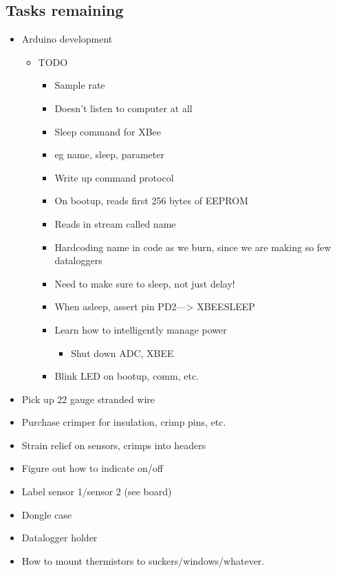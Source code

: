 \documentclass{article}
\begin{document}
\subsection{Tasks remaining}

\begin{itemize}
\item Arduino development

\begin{itemize}
\item TODO

\begin{itemize}
\item Sample rate
\item Doesn't listen to computer at all
\item Sleep command for XBee
\item eg name, sleep, parameter
\item Write up command protocol
\item On bootup, reads first 256 bytes of EEPROM
\item Reads in stream called name
\item Hardcoding name in code as we burn, since we are making so few dataloggers
\item Need to make sure to sleep, not just delay!
\item When asleep, assert pin PD2---\textgreater{} XBEESLEEP
\item Learn how to intelligently manage power

\begin{itemize}
\item Shut down ADC, XBEE
\end{itemize}
\item Blink LED on bootup, comm, etc.
\end{itemize}
\end{itemize}
\item Pick up 22 gauge stranded wire
\item Purchase crimper for insulation, crimp pins, etc.
\item Strain relief on sensors, crimps into headers
\item Figure out how to indicate on/off
\item Label sensor 1/sensor 2 (see board)
\item Dongle case
\item Datalogger holder
\item How to mount thermistors to suckers/windows/whatever.
\end{itemize}
\end{document}
